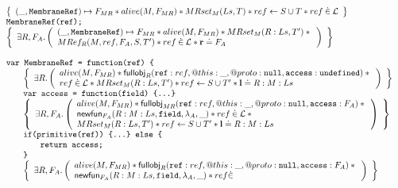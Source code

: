 \documentclass[a4paper]{article}
\begin{document}
\begin{figure}
  \[
    \begin{array}{l}
      \logic{
        (\_,\js{MembraneRef}) \pointsto F_{MR} \sep
        alive(M, F_{MR}) \sep MRset_M(Ls,T) \sep ref \bp S \cup T \sep ref \dotin \loc
      } \\
      \tjs{MembraneRef(ref);} \\
      \logic{
        \exists R, F_A \st \args{
          (\_,\js{MembraneRef}) \pointsto F_{MR} \sep
          alive(M, F_{MR}) \sep MRset_M(R:Ls,T') \sep {} \\
          MRef_{R}(M,ref,F_A,S,T') \sep ref \dotin \loc \sep \rv \doteq F_A
        }
      } \\
      \\
      \tjs{var MembraneRef = function(ref) \{} \\
        \indblock{
          \logic{
            \exists R \st \args{
              alive(M, F_{MR}) \sep  \fullobj_{R}(\js{ref}: ref, @this: \_, @proto: \nil, \js{access}:
                \und) \sep {} \\
              ref \dotin \loc \sep
              MRset_M(R:Ls,T') \sep ref \bp S \cup T' \sep \ls \doteq R:M:Ls
            }
          } \\
          \tjs{var access = function(field) \{...\}} \\
          \logic{
            \exists R,F_A \st \args{
              alive(M, F_{MR}) \sep \fullobj_{MR}(\js{ref}: ref, @this: \_, @proto: \nil, \js{access}:
                F_A) \sep {} \\
              \newfun_{F_A}(R:M:Ls, \js{field}, \lambda_A, \_) \sep ref \dotin
              \loc \sep {} \\
              MRset_M(R:Ls,T') \sep ref \bp S \cup T' \sep \ls \doteq R:M:Ls
            }
          } \\
          \tjs{if(primitive(ref)) \{...\} else \{} \\
            \indblock{
              \tjs{return access;} \\
            }
          \tjs{\}} \\
          \logic{
            \exists R,F_A \st \args{
              alive(M, F_{MR}) \sep \fullobj_{R}(\js{ref}: ref, @this: \_, @proto: \nil, \js{access}:
                F_A) \sep {} \\
              \newfun_{F_A}(R:M:Ls, \js{field}, \lambda_A, \_) \sep ref \dotin
}}}
\end{array}\]
\end{figure}
\end{document}
